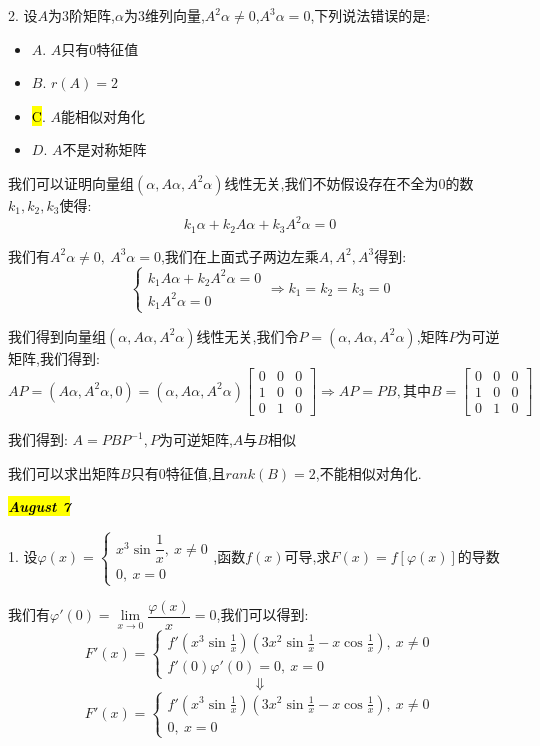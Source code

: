 2. 设$A$为$3$阶矩阵,$\alpha$为$3$维列向量,$A^2\alpha\neq 0$,$A^3\alpha=0$,下列说法错误的是:  
\begin{itemize}
	\item $A$. $A$只有$0$特征值
	\item $B$. $r(A)=2$
	\item \hl{C}. $A$能相似对角化
	\item $D$. $A$不是对称矩阵
\end{itemize}
\begin{solution}

	我们可以证明向量组$(\alpha,A\alpha,A^2\alpha)$线性无关,我们不妨假设存在不全为$0$的数$k_{1},k_{2},k_{3}$使得:  
	$$k_{1}\alpha+k_{2}A\alpha+k_{3}A^2\alpha=0$$
	
	我们有$A^2\alpha\neq 0,\ A^3\alpha=0$,我们在上面式子两边左乘$A,A^2,A^3$得到:  
	$$\left\lbrace
	\begin{array}{l}
		k_{1}A\alpha+k_{2}A^2\alpha=0\\
		k_{1}A^2\alpha=0
	\end{array}
	\right. \Rightarrow k_{1}=k_{2}=k_{3}=0$$
	
	我们得到向量组$(\alpha,A\alpha,A^2\alpha)$线性无关,我们令$P=(\alpha,A\alpha,A^2\alpha)$,矩阵$P$为可逆矩阵,我们得到:  
	$$AP=(A\alpha,A^2\alpha,0)=(\alpha,A\alpha,A^2\alpha)\left[ \begin{matrix}
		0&0&0\\1&0&0\\0&1&0
	\end{matrix}\right] \Rightarrow AP=PB,\text{其中}B=\left[ \begin{matrix}
	0&0&0\\1&0&0\\0&1&0
\end{matrix}\right] $$

我们得到:  $A=PBP^{-1},P\text{为可逆矩阵}$,$A$与$B$相似

我们可以求出矩阵$B$只有$0$特征值,且$rank(B)=2$,不能相似对角化.
\end{solution}

\hl{\textbf{\textit{August 7}}}

1. 设$\varphi(x)=\left\lbrace
\begin{array}{l}
	x^3\sin\dfrac{1}{x},\ x\neq 0\\
	0,\ x=0
\end{array}
\right. $,函数$f(x)$可导,求$F(x)=f[\varphi(x)]$的导数
\begin{solution}

	我们有$\varphi'(0)=\lim\limits_{x\rightarrow 0}\dfrac{\varphi(x)}{x}=0$,我们可以得到:  
	$$F'(x)=\left\lbrace
	\begin{array}{l}
		f'(x^3\sin\frac{1}{x})(3x^2\sin\frac{1}{x}-x\cos\frac{1}{x}),\ x\neq 0\\
		f'(0)\varphi'(0)=0,\ x=0
	\end{array}
	\right.$$
	$$\Downarrow$$ 
	$$ F'(x)=\left\lbrace
	\begin{array}{l}
		f'(x^3\sin\frac{1}{x})(3x^2\sin\frac{1}{x}-x\cos\frac{1}{x}),\ x\neq 0\\
		0,\ x=0
	\end{array}
	\right. $$
\end{solution}

